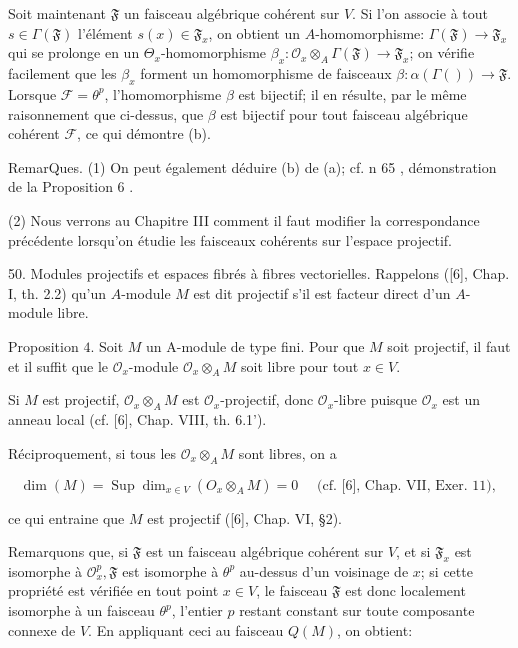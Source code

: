 Soit maintenant $\mathfrak{F}$ un faisceau algébrique cohérent sur $V$. Si l'on associe à tout $s \in \Gamma(\mathfrak{F})$ l'élément $s(x) \in \mathfrak{F}_{x}$, on obtient un $A$-homomorphisme: $\Gamma(\mathfrak{F}) \rightarrow \mathfrak{F}_{x}$ qui se prolonge en un $\Theta_{x}$-homomorphisme $\beta_{x}: \mathcal{O}_{x} \otimes_{A} \Gamma(\mathfrak{F}) \rightarrow \mathfrak{F}_{x}$; on vérifie facilement que les $\beta_{x}$ forment un homomorphisme de faisceaux $\beta: \alpha(\Gamma(\mathfrak{})) \rightarrow \mathfrak{F} .$ Lorsque $\mathscr{F}=\theta^{p}$, l'homomorphisme $\beta$ est bijectif; il en résulte, par le même raisonnement que ci-dessus, que $\beta$ est bijectif pour tout faisceau algébrique cohérent $\mathcal{F}$, ce qui démontre (b).

RemarQues. (1) On peut également déduire (b) de (a); cf. n 65 , démonstration de la Proposition 6 .

(2) Nous verrons au Chapitre III comment il faut modifier la correspondance précédente lorsqu'on étudie les faisceaux cohérents sur l'espace projectif.

50. Modules projectifs et espaces fibrés à fibres vectorielles. Rappelons ([6], Chap. I, th. 2.2) qu'un $A$-module $M$ est dit projectif s'il est facteur direct d'un $A$-module libre.

Proposition $4 .$ Soit $M$ un A-module de type fini. Pour que $M$ soit projectif, il faut et il suffit que le $\mathcal{O}_{x}$-module $\mathcal{O}_{x} \otimes_{A} M$ soit libre pour tout $x \in V$.

Si $M$ est projectif, $\mathcal{O}_{x} \otimes_{A} M$ est $\mathcal{O}_{x}$-projectif, donc $\mathcal{O}_{x}$-libre puisque $\mathcal{O}_{x}$ est un anneau local (cf. [6], Chap. VIII, th. 6.1').

Réciproquement, si tous les $\mathcal{O}_{x} \otimes_{A} M$ sont libres, on a

$$
\operatorname{dim}(M)=\operatorname{Sup} \operatorname{dim}_{x \in V}\left(O_{x} \otimes_{A} M\right)=0 \quad \text { (cf. [6], Chap. VII, Exer. 11), }
$$

ce qui entraine que $M$ est projectif ([6], Chap. VI, §2).

Remarquons que, si $\mathfrak{F}$ est un faisceau algébrique cohérent sur $V$, et si $\mathfrak{F}_{x}$ est isomorphe à $\mathcal{O}_{x}^{p}, \mathfrak{F}$ est isomorphe à $\theta^{p}$ au-dessus d'un voisinage de $x$; si cette propriété est vérifiée en tout point $x \in V$, le faisceau $\mathfrak{F}$ est donc localement isomorphe à un faisceau $\theta^{p}$, l'entier $p$ restant constant sur toute composante connexe de $V$. En appliquant ceci au faisceau $Q(M)$, on obtient:

